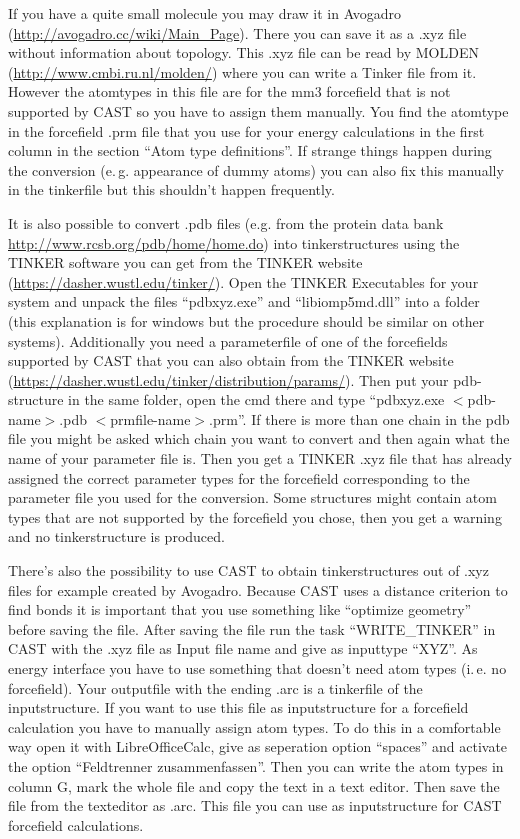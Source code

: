 \documentclass[10pt,a4paper]{article} %
\begin{document}
	If you have a quite small molecule you may draw it in Avogadro (\url{http://avogadro.cc/wiki/Main_Page}). There you can save it as a .xyz file without information about topology. This .xyz file can be read by MOLDEN (\url{http://www.cmbi.ru.nl/molden/}) where you can write a Tinker file from it. However the atomtypes in this file are for the mm3 forcefield that is not supported by \ac{CAST} so you have to assign them manually. You find the atomtype in the forcefield .prm file that you use for your energy calculations in the first column in the section ``Atom type definitions''. If strange things happen during the conversion (e.\,g. appearance of dummy atoms) you can also fix this manually in the tinkerfile but this shouldn't happen frequently.
	
	It is also possible to convert .pdb files (e.g. from the protein data bank \url{http://www.rcsb.org/pdb/home/home.do}) into tinkerstructures using the TINKER software you can get from the TINKER website (\url{https://dasher.wustl.edu/tinker/}). Open the TINKER Executables for your system and unpack the files ``pdbxyz.exe'' and ``libiomp5md.dll'' into a folder (this explanation is for windows but the procedure should be similar on other systems). Additionally you need a parameterfile of one of the forcefields supported by \ac{CAST} that you can also obtain from the TINKER website (\url{https://dasher.wustl.edu/tinker/distribution/params/}). Then put your pdb-structure in the same folder, open the cmd there and type ``pdbxyz.exe $<$pdb-name$>$.pdb $<$prmfile-name$>$.prm''. If there is more than one chain in the pdb file you might be asked which chain you want to convert and then again what the name of your parameter file is. Then you get a TINKER .xyz file that has already assigned the correct parameter types for the forcefield corresponding to the parameter file you used for the conversion. Some structures might contain atom types that are not supported by the forcefield you chose, then you get a warning and no tinkerstructure is produced.
	
	There's also the possibility to use CAST to obtain tinkerstructures out of .xyz files for example created by Avogadro. Because CAST uses a distance criterion to find bonds it is important that you use something like ``optimize geometry'' before saving the file. After saving the file run the task ``WRITE\_TINKER'' in CAST with the .xyz file as Input file name and give as inputtype ``XYZ''. As energy interface you have to use something that doesn't need atom types (i.\,e. no forcefield). Your outputfile with the ending .arc is a tinkerfile of the inputstructure. If you want to use this file as inputstructure for a forcefield calculation you have to manually assign atom types. To do this in a comfortable way open it with LibreOfficeCalc, give as seperation option ``spaces'' and activate the option ``Feldtrenner zusammenfassen''. Then you can write the atom types in column G, mark the whole file and copy the text in a text editor. Then save the file from the texteditor as .arc. This file you can use as inputstructure for CAST forcefield calculations.
	
\end{document}
